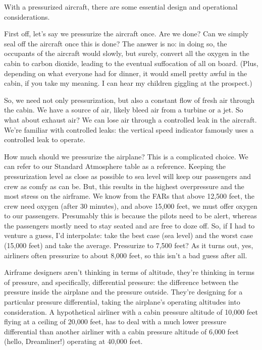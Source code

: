 With a pressurized aircraft, there are some essential design and operational considerations.

First off, let's say we pressurize the aircraft once. Are we done? Can we simply seal off the aircraft once this is done? The answer is no: in doing so, the occupants of the aircraft would slowly, but surely, convert all the oxygen in the cabin to carbon dioxide, leading to the eventual suffocation of all on board. (Plus, depending on what everyone had for dinner, it would smell pretty awful in the cabin, if you take my meaning. I can hear my children giggling at the prospect.)

So, we need not only pressurization, but also a constant flow of fresh air through the cabin. We have a source of air, likely bleed air from a turbine or a jet. So what about exhaust air? We can lose air through a controlled leak in the aircraft. We're familiar with controlled leaks: the vertical speed indicator famously uses a controlled leak to operate.

How much should we pressurize the airplane? This is a complicated choice. We can refer to our Standard Atmosphere table as a reference. Keeping the pressurization level as close as possible to sea level will keep our passengers and crew as comfy as can be. But, this results in the highest overpressure and the most stress on the airframe. We know from the FARs that above 12,500 feet, the crew need oxygen (after 30 minutes), and above 15,000 feet, we must offer oxygen to our passengers. Presumably this is because the pilots need to be alert, whereas the passengers mostly need to stay seated and are free to doze off. So, if I had to venture a guess, I'd interpolate: take the best case (sea level) and the worst case (15,000 feet) and take the average. Pressurize to 7,500 feet? As it turns out, yes, airliners often pressurize to about 8,000 feet, so this isn't a bad guess after all.

Airframe designers aren't thinking in terms of altitude, they're thinking in terms of pressure, and specifically, differential pressure: the difference between the pressure inside the airplane and the pressure outside. They're designing for a particular pressure differential, taking the airplane's operating altitudes into consideration. A hypothetical airliner with a cabin pressure altitude of 10,000 feet flying at a ceiling of 20,000 feet, has to deal with a much lower pressure differential than another airliner with a cabin pressure altitude of 6,000 feet (hello, Dreamliner!) operating at 40,000 feet.

